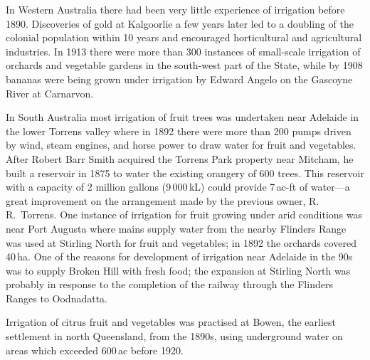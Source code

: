 In Western Australia there had been very little experience of
irrigation before 1890.  Discoveries of gold at Kalgoorlie a few years
later led to a doubling of the colonial population within 10 years and
encouraged horticultural and agricultural industries.  In 1913 there
were more than 300 instances of small-scale irrigation of orchards and
vegetable gardens in the south-west part of the State, while by 1908
bananas were being grown under irrigation by Edward Angelo on the
Gascoyne River at Carnarvon.

In South Australia most irrigation of fruit trees was undertaken near
Adelaide in the lower Torrens valley where in 1892 there were more
than 200 pumps driven by wind, steam engines, and horse power to draw
water for fruit and vegetables.  After Robert Barr Smith acquired
the Torrens Park property near Mitcham, he built a reservoir in 1875
to water the existing orangery of 600 trees.
This reservoir with a capacity of 2 million gallons (9\,000\,kL) could
provide 7\,ac-ft of water---a great improvement on the arrangement
made by the previous owner, R.\,R.~Torrens.  One instance of
irrigation for fruit growing under arid conditions was near Port
Augusta where mains supply water from the nearby Flinders Range was
used at Stirling North for fruit and vegetables; in 1892 the orchards
covered 40\,ha.  One of the reasons for development
of irrigation near Adelaide in the 90s was to supply Broken Hill with
fresh food; the expansion at Stirling North was probably in response
to the completion of the railway through the Flinders Ranges to
Oodnadatta.

Irrigation of citrus fruit and vegetables was practised at Bowen, the
earliest settlement in north Queensland, from the 1890s, using
underground water on areas which exceeded 600\,ac before
1920.

